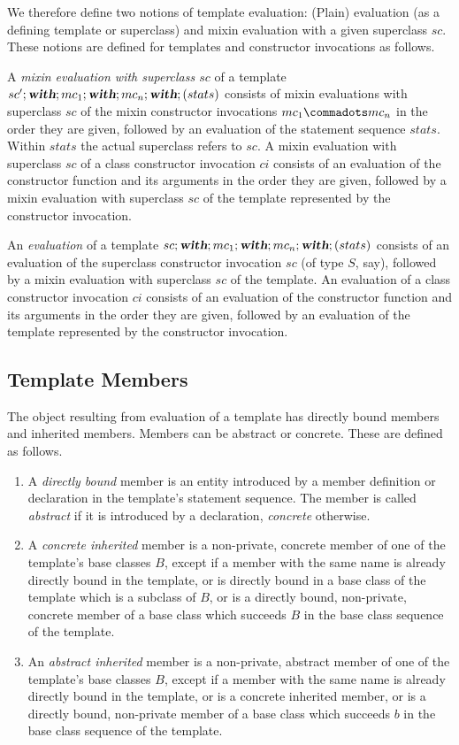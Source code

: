 \documentclass[11pt]{report}
\newcommand{\ifqualified}[1]{}
\begin{document}
We therefore define two notions of template evaluation: (Plain)
evaluation (as a defining template or superclass) and mixin evaluation
with a given superclass $sc$. These notions are defined for templates
and constructor invocations as follows.

A {\em mixin evaluation with superclass $sc$} of a template
$sc';\mbox{\sl\bfseries with};mc_1;\mbox{\sl\bfseries with};mc_n;\mbox{\sl\bfseries with};(stats)$ consists of mixin
evaluations with superclass $sc$ of the mixin constructor invocations
$mc_1 \commadots mc_n$ in the order they are given, followed by an
evaluation of the statement sequence $stats$.  Within $stats$ the
actual superclass refers to $sc$.  A mixin evaluation with superclass
$sc$ of a class constructor invocation $ci$ consists of an evaluation
of the constructor function and its arguments in the order they are
given, followed by a mixin evaluation with superclass $sc$ of the
template represented by the constructor invocation.

An {\em evaluation} of a template
$sc;\mbox{\sl\bfseries with};mc_1;\mbox{\sl\bfseries with};mc_n;\mbox{\sl\bfseries with};(stats)$ consists of an evaluation of
the superclass constructor invocation $sc$ (of type $S$, say),
followed by a mixin evaluation with superclass $sc$ of the template. An
evaluation of a class constructor invocation $ci$ consists of an
evaluation of the constructor function and its arguments in
the order they are given, followed by an evaluation of the template
represented by the constructor invocation.

\subsection{Template Members}

\label{sec:members}

The object resulting from evaluation of a template has directly bound
members and inherited members. Members can be abstract or concrete.
These are defined as follows.
\begin{enumerate}
\item
A {\em directly bound} member is an entity introduced by a member
definition or declaration in the template's statement sequence. The
member is called {\em abstract} if it is introduced by a declaration,
{\em concrete} otherwise.
\item
A {\em concrete inherited} member is a non-private, concrete member of
one of the template's base classes $B$, except if a member with the
same \ifqualified{qualified} name is already directly bound in the template, or is
directly bound in a base class of the template which is a subclass of
$B$, or is a directly bound, non-private, concrete member of a base
class which succeeds $B$ in the base class sequence of the template.
\item
An {\em abstract inherited} member is a non-private, abstract member
of one of the template's base classes $B$, except if a member with the
same \ifqualified{qualified} name is already directly bound in the template, or is a
concrete inherited member, or is a directly bound, non-private member
of a base class which succeeds $b$ in the base class sequence of the
template.
\end{enumerate}
\end{document}
